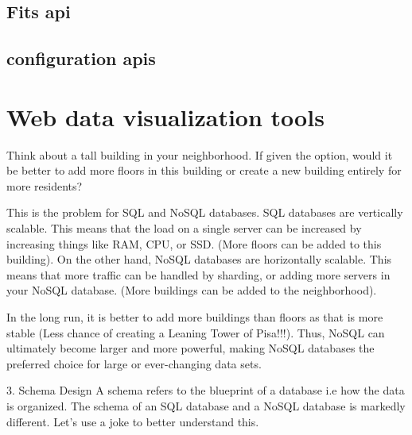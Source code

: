 \documentclass[preprint,11pt]{elsarticle}
\begin{document}
\subsection{Fits api}
\subsection{configuration apis}
\section{Web data visualization tools}
Think about a tall building in your neighborhood. If given the option, would it be better to add more floors in this building or create a new building entirely for more residents?

This is the problem for SQL and NoSQL databases. SQL databases are vertically scalable. This means that the load on a single server can be increased by increasing things like RAM, CPU, or SSD. (More floors can be added to this building). On the other hand, NoSQL databases are horizontally scalable. This means that more traffic can be handled by sharding, or adding more servers in your NoSQL database. (More buildings can be added to the neighborhood).

In the long run, it is better to add more buildings than floors as that is more stable (Less chance of creating a Leaning Tower of Pisa!!!). Thus, NoSQL can ultimately become larger and more powerful, making NoSQL databases the preferred choice for large or ever-changing data sets.

3. Schema Design
A schema refers to the blueprint of a database i.e how the data is organized. The schema of an SQL database and a NoSQL database is markedly different. Let’s use a joke to better understand this.
\end{document}
